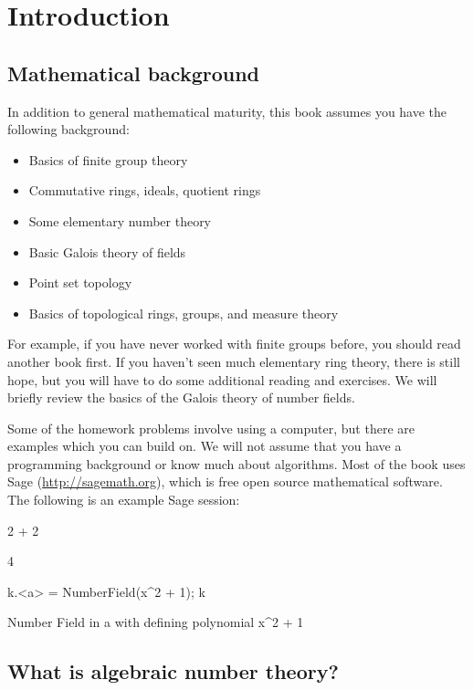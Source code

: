 \chapter{Introduction}

\section{Mathematical background}

In addition to general mathematical maturity,
this book assumes you have the following background:
\begin{itemize}\setlength{\itemsep}{-.7ex}
	\item Basics of finite group theory
	\item Commutative rings, ideals, quotient rings
	\item Some elementary number theory
	\item Basic Galois theory of fields
	\item Point set topology
	\item Basics of topological rings, groups, and measure theory
\end{itemize}
For example, if you have never worked with finite groups before, you
should read another book first. If you haven't seen much elementary
ring theory, there is still hope, but you will have to do some
additional reading and exercises.  We will briefly review the basics of
the Galois theory of number fields.

Some of the homework problems involve using a computer, but there
are examples which you can build on.  We will not assume that you have
a programming background or know much about algorithms. Most
of the book uses Sage (\url{http://sagemath.org}), which is
free open source mathematical software.  The following is an example
Sage session:
\begin{sagecode}
\begin{sagecell}
2 + 2
\end{sagecell}
\begin{sageout}
4
\end{sageout}
\begin{sagecell}
k.<a> = NumberField(x^2 + 1); k
\end{sagecell}
\begin{sageout}
Number Field in a with defining polynomial x^2 + 1
\end{sageout}
\end{sagecode}

\section{What is algebraic number theory?}

